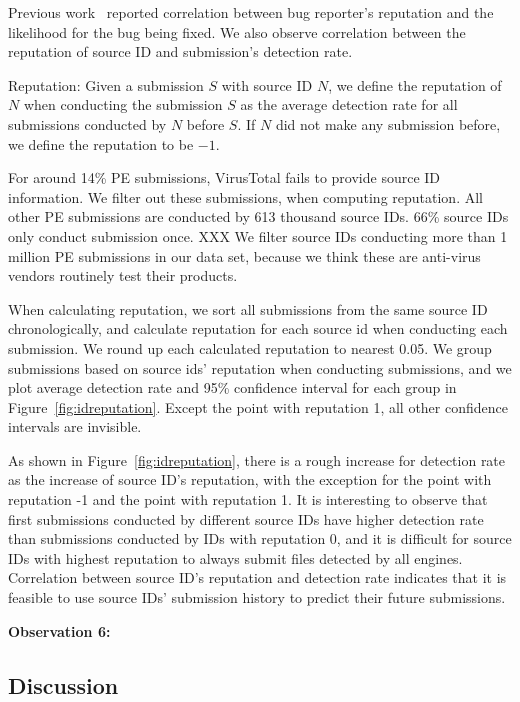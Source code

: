 
Previous work~\cite{GuoICSE2010} reported correlation between bug reporter’s reputation and the likelihood for the bug being fixed. 
We also observe correlation between the reputation of source ID and submission’s detection rate. 

\begin{definition}{Reputation:}
Given a submission $S$ with source ID $N$, 
we define the reputation of $N$ when conducting the submission $S$ as the average detection rate for all submissions conducted by $N$ before $S$. 
If $N$ did not make any submission before, we define the reputation to be $-1$. 
\end{definition}

For around 14\% PE submissions, VirusTotal fails to provide source ID information. 
We filter out these submissions, when computing reputation.
All other PE submissions are conducted by 613 thousand source IDs. 
66\% source IDs only conduct submission once. 
XXX
We filter source IDs conducting more than 1 million PE submissions in our data set, 
because we think these are anti-virus vendors routinely test their products. 

When calculating reputation, we sort all submissions from the same source ID chronologically, 
and calculate reputation for each source id when conducting each submission. 
We round up each calculated reputation to nearest 0.05. 
We group submissions based on source ids' reputation when conducting submissions, 
and we plot average detection rate and 95\% confidence interval for each group in Figure~\ref{fig:idreputation}. 
Except the point with reputation 1, all other confidence intervals are invisible.  

As shown in Figure~\ref{fig:idreputation}, 
there is a rough increase for detection rate as the increase of source ID's reputation, 
with the exception for the point with reputation -1 and the point with reputation 1. 
It is interesting to observe that first submissions conducted by different source IDs have higher 
detection rate than submissions conducted by IDs with reputation 0, 
and it is difficult for source IDs with highest reputation to always submit files detected by all engines. 
Correlation between source ID's reputation and detection rate indicates 
that it is feasible to use source IDs' submission history to predict their future submissions.

{\bf Observation 6:} 
{\em }

\subsection{Discussion}

